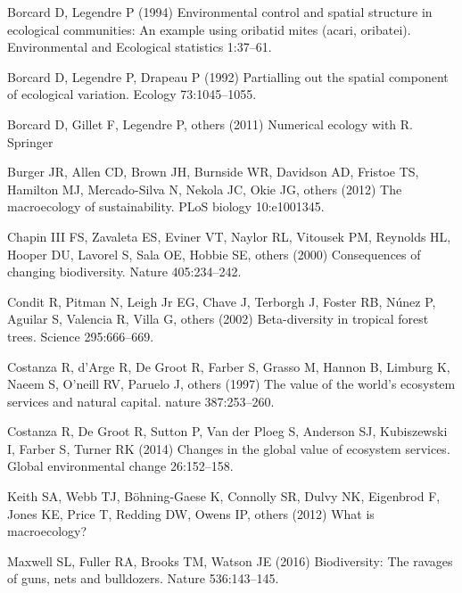 \documentclass[
  12pt,
]{book}
\newlength{\cslhangindent}
\newenvironment{CSLReferences}[2] %
 {\begin{list}{}{%
  \setlength{\itemindent}{0pt}
  \setlength{\leftmargin}{0pt}
  \setlength{\parsep}{0pt}
  \ifodd #1
   \setlength{\leftmargin}{\cslhangindent}
   \setlength{\itemindent}{-1\cslhangindent}
  \fi
  \setlength{\itemsep}{#2\baselineskip}}}
 {\end{list}}
\begin{document}
\label{refs}
\begin{CSLReferences}{1}{1}
Borcard D, Legendre P (1994) Environmental control and spatial structure
in ecological communities: An example using oribatid mites (acari,
oribatei). Environmental and Ecological statistics 1:37--61.

Borcard D, Legendre P, Drapeau P (1992) Partialling out the spatial
component of ecological variation. Ecology 73:1045--1055.

Borcard D, Gillet F, Legendre P, others (2011) Numerical ecology with
{R}. Springer

Burger JR, Allen CD, Brown JH, Burnside WR, Davidson AD, Fristoe TS,
Hamilton MJ, Mercado-Silva N, Nekola JC, Okie JG, others (2012) The
macroecology of sustainability. PLoS biology 10:e1001345.

Chapin III FS, Zavaleta ES, Eviner VT, Naylor RL, Vitousek PM, Reynolds
HL, Hooper DU, Lavorel S, Sala OE, Hobbie SE, others (2000) Consequences
of changing biodiversity. Nature 405:234--242.

Condit R, Pitman N, Leigh Jr EG, Chave J, Terborgh J, Foster RB, Núnez
P, Aguilar S, Valencia R, Villa G, others (2002) Beta-diversity in
tropical forest trees. Science 295:666--669.

Costanza R, d'Arge R, De Groot R, Farber S, Grasso M, Hannon B, Limburg
K, Naeem S, O'neill RV, Paruelo J, others (1997) The value of the
world's ecosystem services and natural capital. nature 387:253--260.

Costanza R, De Groot R, Sutton P, Van der Ploeg S, Anderson SJ,
Kubiszewski I, Farber S, Turner RK (2014) Changes in the global value of
ecosystem services. Global environmental change 26:152--158.

Keith SA, Webb TJ, Böhning-Gaese K, Connolly SR, Dulvy NK, Eigenbrod F,
Jones KE, Price T, Redding DW, Owens IP, others (2012) What is
macroecology?

Maxwell SL, Fuller RA, Brooks TM, Watson JE (2016) Biodiversity: The
ravages of guns, nets and bulldozers. Nature 536:143--145.


\end{CSLReferences}
\end{document}
